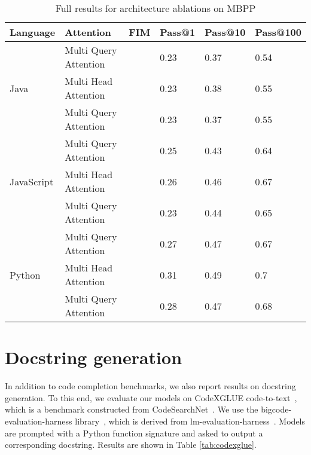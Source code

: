 \documentclass[10pt]{article} \usepackage{iclr2023_conference,times}
\newcommand{\cmark}{\ding{51}}\newcommand{\xmark}{\ding{55}}
\begin{document}
\begin{table}[t]
\centering
\begin{tabular}{llllll}
\toprule
Language & Attention & FIM  & Pass@1 & Pass@10 & Pass@100\\
\midrule
\multirow{3}{*}{Java} & Multi Query Attention & \cmark & 0.23 & 0.37 & 0.54\\
& Multi Head Attention & \cmark & 0.23 & 0.38 & 0.55\\
& Multi Query Attention & \xmark & 0.23 & 0.37 & 0.55\\
\midrule
\multirow{3}{*}{JavaScript} & Multi Query Attention & \cmark & 0.25 & 0.43 & 0.64\\
& Multi Head Attention & \cmark & 0.26 & 0.46& 0.67\\
& Multi Query Attention & \xmark & 0.23 & 0.44 & 0.65\\
\midrule
\multirow{3}{*}{Python} & Multi Query Attention & \cmark & 0.27 & 0.47 & 0.67\\
& Multi Head Attention & \cmark & 0.31 & 0.49 & 0.7\\
& Multi Query Attention & \xmark & 0.28 & 0.47 & 0.68\\
\bottomrule
\end{tabular}
\caption{Full results for architecture ablations on MBPP}
\label{tab:architecture_mbpp}
\end{table}
\newpage


\section{Docstring generation}
In addition to code completion benchmarks, we also report results on docstring generation. To this end, we evaluate our models on CodeXGLUE code-to-text~\cite{lu2021codexglue}, which is a benchmark constructed from CodeSearchNet~\cite{husain2019codesearchnet}. We use the bigcode-evaluation-harness library~\cite{bigcode-evaluation-harness}, which is derived from lm-evaluation-harness~\cite{eval-harness}. Models are prompted with a Python function signature and asked to output a corresponding docstring. Results are shown in Table \ref{tab:codexglue}. 
\end{document}
